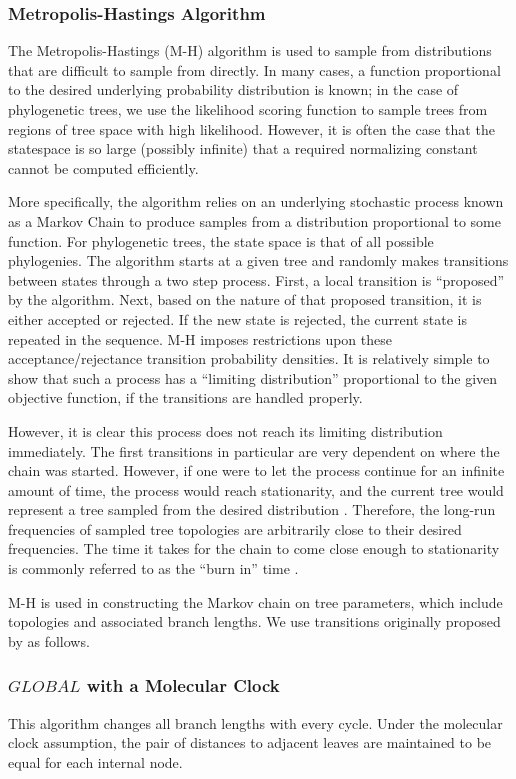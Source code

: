 \documentclass[10pt,twocolumn]{article}
\begin{document}
\subsubsection*{Metropolis-Hastings Algorithm}
The Metropolis-Hastings (M-H) algorithm is used to sample from distributions that are difficult to sample from directly. In many cases, a function proportional to the desired underlying probability distribution is known; in the case of phylogenetic trees, we use the likelihood scoring function to sample trees from regions of tree space with high likelihood. However, it is often the case that the statespace is so large (possibly infinite) that a required normalizing constant cannot be computed efficiently.

More specifically, the algorithm relies on an underlying stochastic process known as a Markov Chain to produce samples from a distribution proportional to some function. For phylogenetic trees, the state space is that of all possible phylogenies. The algorithm starts at a given tree and randomly makes transitions between states through a two step process. First, a local transition is ``proposed'' by the algorithm. Next, based on the nature of that proposed transition, it is either accepted or rejected. If the new state is rejected, the current state is repeated in the sequence. M-H imposes restrictions upon these acceptance/rejectance transition probability densities. It is relatively simple to show that such a process has a ``limiting distribution'' proportional to the given objective function, if the transitions are handled properly.

However, it is clear this process does not reach its limiting distribution immediately. The first transitions in particular are very dependent on where the chain was started. However, if one were to let the process continue for an infinite amount of time, the process would reach stationarity, and the current tree would represent a tree sampled from the desired distribution \cite{larget1999markov}. Therefore, the long-run frequencies of sampled tree topologies are arbitrarily close to their desired frequencies. The time it takes for the chain to come close enough to stationarity is commonly referred to as the ``burn in'' time \cite{larget1999markov}.

M-H is used in constructing the Markov chain on tree parameters, which include topologies and associated branch lengths. We use transitions originally proposed by \cite{larget1999markov} as follows.

\subsubsection*{$GLOBAL$ with a Molecular Clock}
This algorithm changes all branch lengths with every cycle. Under the molecular clock assumption, the pair of distances to adjacent leaves are maintained to be equal for each internal node.
\end{document}
